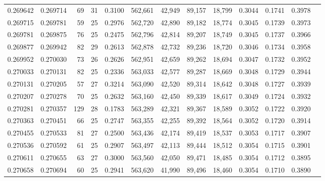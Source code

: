 \begin{tabular}{rrrrrrrrrrrrr}
0.269642 & 0.269714 &  69 &  31 &                                     0.3100 & 562,661 &  42,949 &  89,157 &  18,799 & 0.3044 & 0.1741 & 0.3978 \\
0.269715 & 0.269781 &  59 &  25 &                                     0.2976 & 562,720 &  42,890 &  89,182 &  18,774 & 0.3045 & 0.1739 & 0.3973 \\
0.269781 & 0.269875 &  76 &  25 &                                     0.2475 & 562,796 &  42,814 &  89,207 &  18,749 & 0.3045 & 0.1737 & 0.3966 \\
0.269877 & 0.269942 &  82 &  29 &                                     0.2613 & 562,878 &  42,732 &  89,236 &  18,720 & 0.3046 & 0.1734 & 0.3958 \\
0.269952 & 0.270030 &  73 &  26 &                                     0.2626 & 562,951 &  42,659 &  89,262 &  18,694 & 0.3047 & 0.1732 & 0.3952 \\
0.270033 & 0.270131 &  82 &  25 &                                     0.2336 & 563,033 &  42,577 &  89,287 &  18,669 & 0.3048 & 0.1729 & 0.3944 \\
0.270131 & 0.270205 &  57 &  27 &                                     0.3214 & 563,090 &  42,520 &  89,314 &  18,642 & 0.3048 & 0.1727 & 0.3939 \\
0.270207 & 0.270278 &  70 &  25 &                                     0.2632 & 563,160 &  42,450 &  89,339 &  18,617 & 0.3049 & 0.1724 & 0.3932 \\
0.270281 & 0.270357 & 129 &  28 &                                     0.1783 & 563,289 &  42,321 &  89,367 &  18,589 & 0.3052 & 0.1722 & 0.3920 \\
0.270363 & 0.270451 &  66 &  25 &                                     0.2747 & 563,355 &  42,255 &  89,392 &  18,564 & 0.3052 & 0.1720 & 0.3914 \\
0.270455 & 0.270533 &  81 &  27 &                                     0.2500 & 563,436 &  42,174 &  89,419 &  18,537 & 0.3053 & 0.1717 & 0.3907 \\
0.270536 & 0.270592 &  61 &  25 &                                     0.2907 & 563,497 &  42,113 &  89,444 &  18,512 & 0.3054 & 0.1715 & 0.3901 \\
0.270611 & 0.270655 &  63 &  27 &                                     0.3000 & 563,560 &  42,050 &  89,471 &  18,485 & 0.3054 & 0.1712 & 0.3895 \\
0.270658 & 0.270694 &  60 &  25 &                                     0.2941 & 563,620 &  41,990 &  89,496 &  18,460 & 0.3054 & 0.1710 & 0.3890 \\

\end{tabular}

